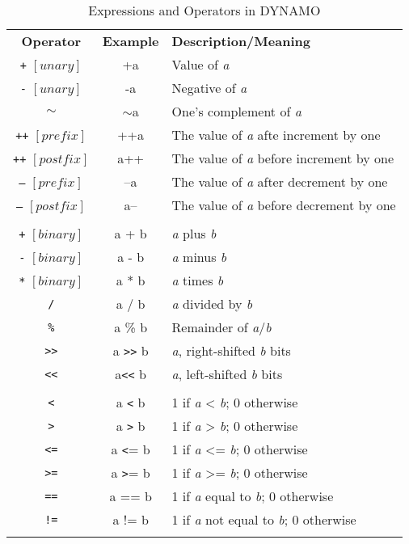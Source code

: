 \begin{fullpage}
\begin{table}[htdp]
\caption{Expressions and Operators in DYNAMO}
\begin{center}
\vspace{.5cm}
\begin{tabular}{ccl}
\textbf{Operator} & \textbf{Example} & \textbf{Description/Meaning}\\
   \texttt{+} $\left[unary\right]$    &  +a       & Value of \emph{a}\\
   \texttt{-} $\left[unary\right]$    &  -a       & Negative of \emph{a}\\
   \texttt{$\sim$}            &  $\sim$a       & One's complement of \emph{a}  \\
   \texttt{++} $\left[prefix\right]$  &  ++a      & The value of \emph{a} afte increment by one\\
   \texttt{++} $\left[postfix\right]$ & a++       & The value of \emph{a} before increment by one\\
   \texttt{--} $\left[prefix\right]$  & --a   & The value of \emph{a} after decrement by one\\
   \texttt{--} $\left[postfix\right]$ & a--   & The value of \emph{a} before decrement by one\\ \\

   \texttt{+} $\left[binary\right]$     & a + b   & \emph{a} plus \emph{b}\\
   \texttt{-} $\left[binary\right]$     & a - b   & \emph{a} minus \emph{b}\\
   \texttt{*} $\left[binary\right]$     & a * b   & \emph{a} times \emph{b}\\
   \texttt{/}              & a / b   & \emph{a} divided by \emph{b}\\
   \texttt{\%}              & a \% b   & Remainder of \emph{a}/\emph{b}\\
   \texttt{>>}             & a \texttt{>>} b  & \emph{a}, right-shifted \emph{b} bits \\
   \texttt{<<}             & a\texttt{<<} b  & \emph{a}, left-shifted \emph{b} bits \\ \\

   \texttt{<}              & a \texttt{<} b   & 1 if \emph{a} < \emph{b}; 0 otherwise       \\
   \texttt{>}              & a \texttt{>} b   & 1 if \emph{a} > \emph{b}; 0 otherwise           \\ 
   \texttt{<=}             & a \texttt{<}= b  & 1 if \emph{a} <= \emph{b}; 0 otherwise           \\
   \texttt{>=}             & a \texttt{>}= b  & 1 if \emph{a} >= \emph{b}; 0 otherwise           \\
   \texttt{==}          & a == b  & 1 if \emph{a} equal to \emph{b}; 0 otherwise \\
   \texttt{!=}             & a != b  & 1 if \emph{a} not equal to \emph{b}; 0 otherwise \\ \\


\end{tabular}
\end{center}
\end{table}
\end{fullpage}
